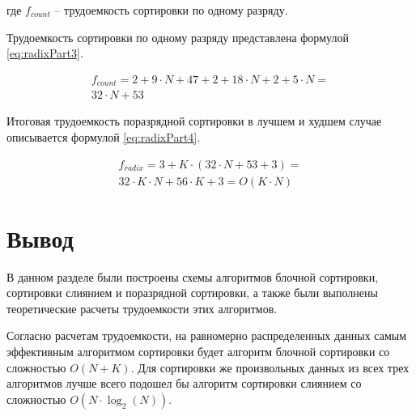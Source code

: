где $f_{count}$ -- трудоемкость сортировки по одному разряду.

Трудоемкость сортировки по одному разряду представлена формулой \ref{eq:radixPart3}.

\begin{equation}
	\label{eq:radixPart3}
	\begin{gathered}
		f_{count} = 2 + 9 \cdot N + 47 + 2 + 18 \cdot N + 2 + 5 \cdot N = \\
		32 \cdot N + 53
	\end{gathered}
\end{equation}

Итоговая трудоемкость поразрядной сортировки в лучшем и худшем случае описывается формулой \ref{eq:radixPart4}.

\begin{equation}
	\label{eq:radixPart4}
	\begin{gathered}
		f_{radix} = 3 + K \cdot (32 \cdot N + 53 + 3) = \\
		32 \cdot K \cdot N + 56 \cdot K + 3 = O(K \cdot N)
	\end{gathered}
\end{equation}

\section*{Вывод}

В данном разделе были построены схемы алгоритмов блочной сортировки, сортировки слиянием и поразрядной сортировки, а также были выполнены теоретические расчеты трудоемкости этих алгоритмов.

Согласно расчетам трудоемкости, на равномерно распределенных данных самым эффективным алгоритмом сортировки будет алгоритм блочной сортировки со сложностью $O(N + K)$. 
Для сортировки же произвольных данных из всех трех алгоритмов лучше всего подошел бы алгоритм сортировки слиянием со сложностью $O(N \cdot \log_2(N))$.  


